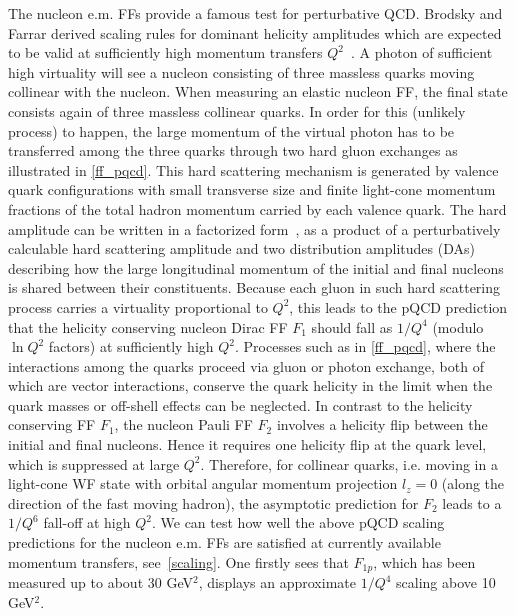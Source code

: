 \indent
The nucleon e.m. FFs 
provide a famous test for perturbative QCD. 
Brodsky and Farrar derived scaling rules for dominant helicity amplitudes 
which are expected to be valid at sufficiently high momentum 
transfers $Q^2$~\cite{brodsky}. A photon of sufficient high 
virtuality will see a nucleon consisting of three massless quarks moving 
collinear with the nucleon. 
When measuring an elastic nucleon FF, 
the final state consists again of 
three massless collinear quarks. In order for this (unlikely process) to 
happen, the large momentum of the virtual photon has to be transferred 
among the three quarks through two hard gluon exchanges as illustrated in 
\ref{ff_pqcd}. This hard scattering mechanism is generated by 
valence quark configurations with small transverse size and finite 
light-cone momentum fractions of the total hadron momentum carried by each 
valence quark. The hard amplitude can be written in a factorized 
form~\cite{Chernyak:1977as,Chernyak:1977fk,Efremov:1979qk,brodlep}, 
as a product of a perturbatively calculable hard scattering amplitude and 
two distribution amplitudes (DAs) 
describing how the large longitudinal momentum 
of the initial and final nucleons is shared between their constituents. 
Because each gluon in such hard scattering process carries a virtuality 
proportional to $Q^2$, this leads to the pQCD prediction that the helicity 
conserving nucleon Dirac FF $F_1$ should fall as $1/Q^4$ 
(modulo $\ln Q^2$ factors) at sufficiently high $Q^2$. 
Processes such as in 
\ref{ff_pqcd}, where the interactions among the quarks proceed 
via gluon or photon exchange, both of which are vector interactions, 
conserve the quark helicity in the limit when the quark masses or off-shell 
effects can be neglected. 
In contrast to the helicity conserving FF $F_1$, the nucleon 
Pauli FF $F_2$ involves a helicity flip between the initial and 
final nucleons. Hence it requires one helicity flip at the quark level, which 
is suppressed at large $Q^2$. Therefore, for collinear quarks, i.e. 
moving in a light-cone WF state with 
orbital angular momentum projection 
$l_z = 0$ (along the direction of the fast moving hadron), 
the asymptotic prediction for $F_2$ leads to a 
$1/Q^6$ fall-off at high $Q^2$. 
\newline
\indent
We can test how well the above pQCD scaling predictions for the 
nucleon e.m. FFs 
are satisfied at currently available momentum transfers, see~\ref{scaling}. 
One firstly sees that $F_{1p}$, which has been measured up to about 
30 GeV$^2$, displays an approximate $1/Q^4$ scaling above 10 GeV$^2$. 
